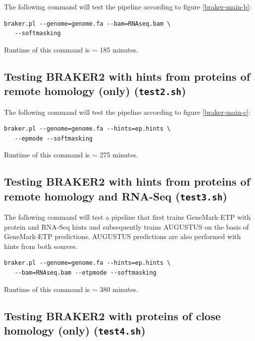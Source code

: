 \documentclass[]{article}
\begin{document}
The following command will test the pipeline according to figure
\ref{braker-main-b}:

\begin{verbatim}
braker.pl --genome=genome.fa --bam=RNAseq.bam \
   --softmasking
\end{verbatim}

Runtime of this command is \(\sim\) 185 minutes.

\subsection{Testing BRAKER2 with hints from proteins of remote homology (only)
(\texttt{test2.sh})}\label{testing-braker2-with-hints-from-proteins-of-remote-homology-only-test2.sh}

The following command will test the pipeline according to figure
\ref{braker-main-c}:

\begin{verbatim}
braker.pl --genome=genome.fa --hints=ep.hints \
   --epmode --softmasking
\end{verbatim}

Runtime of this command is \(\sim\) 275 minutes.

\subsection{Testing BRAKER2 with hints from proteins of remote homology and RNA-Seq
(\texttt{test3.sh})}\label{testing-braker2-with-hints-from-proteins-of-remote-homology-and-rna-seq-test3.sh}

The following command will test a pipeline that first trains
GeneMark-ETP with protein and RNA-Seq hints and subsequently trains
AUGUSTUS on the basis of GeneMark-ETP predictions. AUGUSTUS predictions
are also performed with hints from both sources.

\begin{verbatim}
braker.pl --genome=genome.fa --hints=ep.hints \
   --bam=RNAseq.bam --etpmode --softmasking
\end{verbatim}

Runtime of this command is \(\sim\) 380 minutes.

\subsection{Testing BRAKER2 with proteins of close homology (only)
(\texttt{test4.sh})}\label{testing-braker2-with-proteins-of-close-homology-only-test4.sh}
\end{document}

